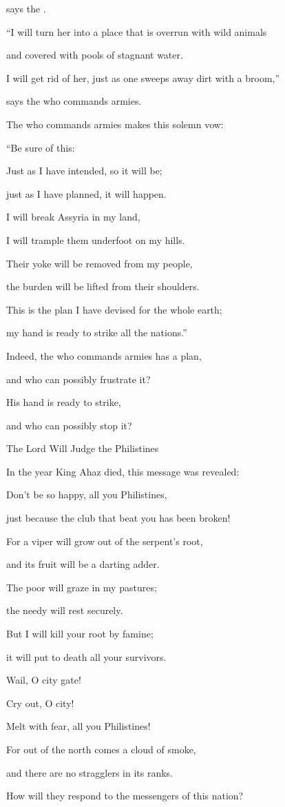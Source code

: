 {\par }{\Q says
the
{}.
\par }{\Q {}“I will turn
her into
a place that is overrun
with wild animals
\par }{\Q and covered with pools
of stagnant water.
\par }{\Q I will get rid of
her, just as one sweeps
away dirt with a broom,”
\par }{\Q says
the {}
who commands armies.
\par }{\Q The
{}
who commands armies
makes
this solemn
vow:
\par }{\Q “Be sure of this:
\par }{\Q Just
as I have intended,
so
it will be;
\par }{\Q just
as I have planned,
it will happen.
\par }{\Q {}I will break
Assyria
in
my land,
\par }{\Q I will trample
them underfoot on
my hills.
\par }{\Q Their yoke
will be removed from
my people,
\par }{\Q the burden
will be lifted from
their shoulders.
\par }{\Q {}This
is the plan
I have devised
for the whole
earth;
\par }{\Q my hand
is ready to strike
all
the nations.”
\par }{\Q {}Indeed,
the {}
who commands armies
has a plan,
\par }{\Q and who can
possibly frustrate
it?
\par }{\Q His hand
is ready to strike,
\par }{\Q and who can
possibly stop it?
\par }{\SH The Lord Will Judge the Philistines
\par }{\PP {}In the year
King
Ahaz
died,
this
message
was revealed:
\par }{\Q {}Don’t
be so happy,
all
you Philistines,
\par }{\Q just because
the club
that beat
you has been broken!

\par }{\Q For
a viper
will grow out
of the serpent’s
root,
\par }{\Q and its fruit
will be a darting
adder.
\par }{\Q {}The poor
will graze
in my pastures;

\par }{\Q the needy
will rest
securely.
\par }{\Q But I will kill
your root
by famine;
\par }{\Q it will put to death
all your survivors.
\par }{\Q {}Wail,
O city gate!
\par }{\Q Cry out,
O city!
\par }{\Q Melt
with fear, all
you Philistines!
\par }{\Q For
out of the north
comes
a cloud of smoke,
\par }{\Q and there are no
stragglers
in its ranks.
\par }{\Q {}How
will they respond
to the messengers
of this nation?

}

